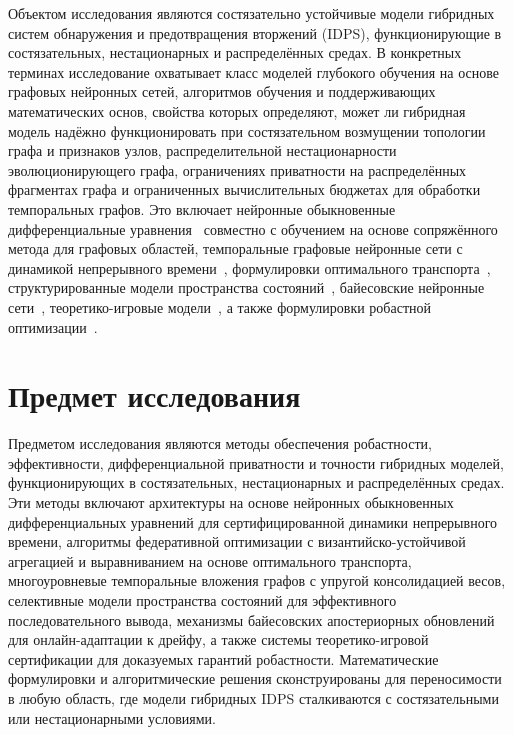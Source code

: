 Объектом исследования являются состязательно устойчивые модели гибридных систем обнаружения и предотвращения вторжений (IDPS), функционирующие в состязательных, нестационарных и распределённых средах. В конкретных терминах исследование охватывает класс моделей глубокого обучения на основе графовых нейронных сетей, алгоритмов обучения и поддерживающих математических основ, свойства которых определяют, может ли гибридная модель надёжно функционировать при состязательном возмущении топологии графа и признаков узлов, распределительной нестационарности эволюционирующего графа, ограничениях приватности на распределённых фрагментах графа и ограниченных вычислительных бюджетах для обработки темпоральных графов. Это включает нейронные обыкновенные дифференциальные уравнения~\cite{Chen2018,Pontryagin1962} совместно с обучением на основе сопряжённого метода для графовых областей, темпоральные графовые нейронные сети с динамикой непрерывного времени~\cite{Xu2020tgat,Rossi2020,Chamberlain2021}, формулировки оптимального транспорта~\cite{Villani2009,Peyre2019,Cuturi2013,Chizat2020}, структурированные модели пространства состояний~\cite{Gu2022,Dao2024,Behrouz2024graphmamba}, байесовские нейронные сети~\cite{Blundell2015,Lakshminarayanan2017}, теоретико-игровые модели~\cite{Tambe2011,Sinha2018}, а также формулировки робастной оптимизации~\cite{Madry2018,Zhang2019trades,Goodfellow2015}.


\section*{Предмет исследования}

Предметом исследования являются методы обеспечения робастности, эффективности, дифференциальной приватности и точности гибридных моделей, функционирующих в состязательных, нестационарных и распределённых средах. Эти методы включают архитектуры на основе нейронных обыкновенных дифференциальных уравнений для сертифицированной динамики непрерывного времени, алгоритмы федеративной оптимизации с византийско-устойчивой агрегацией и выравниванием на основе оптимального транспорта, многоуровневые темпоральные вложения графов с упругой консолидацией весов, селективные модели пространства состояний для эффективного последовательного вывода, механизмы байесовских апостериорных обновлений для онлайн-адаптации к дрейфу, а также системы теоретико-игровой сертификации для доказуемых гарантий робастности. Математические формулировки и алгоритмические решения сконструированы для переносимости в любую область, где модели гибридных IDPS сталкиваются с состязательными или нестационарными условиями.


